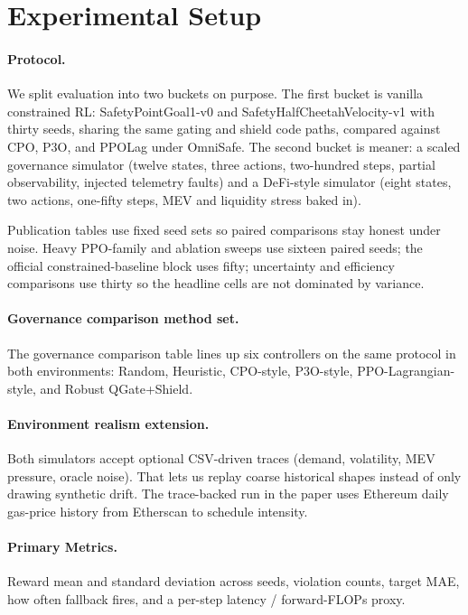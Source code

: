 \section{Experimental Setup}

\paragraph{Protocol.}
We split evaluation into two buckets on purpose. The first bucket is vanilla constrained RL: SafetyPointGoal1-v0 and SafetyHalfCheetahVelocity-v1 with thirty seeds, sharing the same gating and shield code paths, compared against CPO, P3O, and PPOLag under OmniSafe. The second bucket is meaner: a scaled governance simulator (twelve states, three actions, two-hundred steps, partial observability, injected telemetry faults) and a DeFi-style simulator (eight states, two actions, one-fifty steps, MEV and liquidity stress baked in).

Publication tables use fixed seed sets so paired comparisons stay honest under noise. Heavy PPO-family and ablation sweeps use sixteen paired seeds; the official constrained-baseline block uses fifty; uncertainty and efficiency comparisons use thirty so the headline cells are not dominated by variance.

\paragraph{Governance comparison method set.}
The governance comparison table lines up six controllers on the same protocol in both environments: Random, Heuristic, CPO-style, P3O-style, PPO-Lagrangian-style, and Robust QGate+Shield.

\paragraph{Environment realism extension.}
Both simulators accept optional CSV-driven traces (demand, volatility, MEV pressure, oracle noise). That lets us replay coarse historical shapes instead of only drawing synthetic drift. The trace-backed run in the paper uses Ethereum daily gas-price history from Etherscan to schedule intensity.

\paragraph{Primary Metrics.}
Reward mean and standard deviation across seeds, violation counts, target MAE, how often fallback fires, and a per-step latency / forward-FLOPs proxy.

